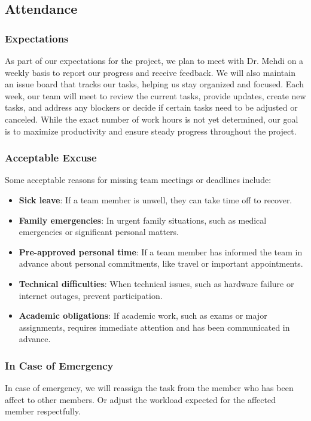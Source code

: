 \documentclass{article}
\begin{document}
\subsection*{Attendance}

\subsubsection*{Expectations}
As part of our expectations for the project, we plan to meet with Dr. Mehdi on a weekly basis to report our progress and receive feedback. We will also maintain an issue board that tracks our tasks, helping us stay organized and focused. Each week, our team will meet to review the current tasks, provide updates, create new tasks, and address any blockers or decide if certain tasks need to be adjusted or canceled. While the exact number of work hours is not yet determined, our goal is to maximize productivity and ensure steady progress throughout the project.


\subsubsection*{Acceptable Excuse}
Some acceptable reasons for missing team meetings or deadlines include:
\begin{itemize}
    \item \textbf{Sick leave}: If a team member is unwell, they can take time off to recover.
    \item \textbf{Family emergencies}: In urgent family situations, such as medical emergencies or significant personal matters.
    \item \textbf{Pre-approved personal time}: If a team member has informed the team in advance about personal commitments, like travel or important appointments.
    \item \textbf{Technical difficulties}: When technical issues, such as hardware failure or internet outages, prevent participation.
    \item \textbf{Academic obligations}: If academic work, such as exams or major assignments, requires immediate attention and has been communicated in advance.
\end{itemize}

\subsubsection*{In Case of Emergency}

In case of emergency, we will reassign the task from the member who has been affect to other members. Or adjust the workload expected for the affected member respectfully.\\
\end{document}
